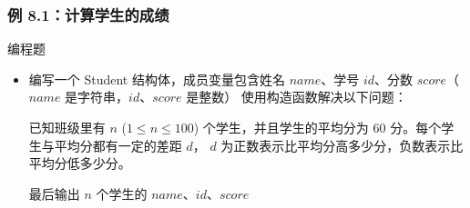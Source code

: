 \begin{frame}[fragile]
    \frametitle{例 8.1：计算学生的成绩}

     {
        
    } {
        \begin{exampleblock}{编程题}
            \begin{itemize}
                \item 编写一个 Student 结构体，成员变量包含姓名 $name$、学号 $id$、分数 $score$（$name$ 是字符串，$id$、$score$ 是整数）
                        使用构造函数解决以下问题：

                        已知班级里有 $n$ ($1 \leq n \leq 100$) 个学生，并且学生的平均分为 $60$ 分。每个学生与平均分都有一定的差距 $d$，
                        $d$ 为正数表示比平均分高多少分，负数表示比平均分低多少分。
                        
                        最后输出 $n$ 个学生的 $name$、$id$、$score$
                
    
            \end{itemize}
        \end{exampleblock}
    }

\end{frame}


